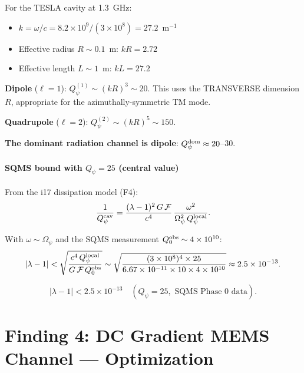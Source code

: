 \documentclass[11pt]{article}
\newcommand{\ee}[1]{\times 10^{#1}}
\newcommand{\Opsi}{\Omega_\psi}
\newcommand{\Qpsi}{Q_\psi}
\newcommand{\lbone}{|\lambda - 1|}
\theoremstyle{definition}
\theoremstyle{remark}
\begin{document}
For the TESLA cavity at 1.3~GHz:
\begin{itemize}[nosep]
\item $k = \omega/c = 8.2\ee{9}/(3\ee{8}) = 27.2$~m$^{-1}$
\item Effective radius $R \sim 0.1$~m: $kR = 2.72$
\item Effective length $L \sim 1$~m: $kL = 27.2$
\end{itemize}

\textbf{Dipole} ($\ell = 1$): $\Qpsi^{(1)} \sim (kR)^{3} \sim 20$.
This uses the TRANSVERSE dimension $R$, appropriate for the
azimuthally-symmetric TM mode.

\textbf{Quadrupole} ($\ell = 2$): $\Qpsi^{(2)} \sim (kR)^{5} \sim 150$.

\textbf{The dominant radiation channel is dipole}: $\Qpsi^{\rm dom}
\approx 20$--$30$.

\subsection{SQMS bound with $\Qpsi = 25$ (central value)}

From the i17 dissipation model (F4):
\begin{equation}
\frac{1}{Q_\psi^{\rm cav}} = \frac{(\lambda-1)^2\,G\,\mathcal{F}}
{c^4}\,\frac{\omega^2}{\Opsi^2\,\Qpsi^{\rm local}}.
\end{equation}

With $\omega \sim \Opsi$ and the SQMS measurement $Q_0^{\rm obs}
\sim 4\ee{10}$:
\begin{equation}
\lbone < \sqrt{\frac{c^4\,\Qpsi^{\rm local}}{G\,\mathcal{F}\,Q_0^{\rm obs}}}
\sim \sqrt{\frac{(3\ee{8})^4 \times 25}{6.67\ee{-11} \times 10
\times 4\ee{10}}} \approx 2.5\ee{-13}.
\end{equation}

\begin{equation}
\boxed{\lbone < 2.5\ee{-13} \quad (\Qpsi = 25, \text{ SQMS Phase 0 data}).}
\end{equation}


\part{Finding 4: DC Gradient MEMS Channel --- Optimization}
\label{part:mems}
\end{document}
